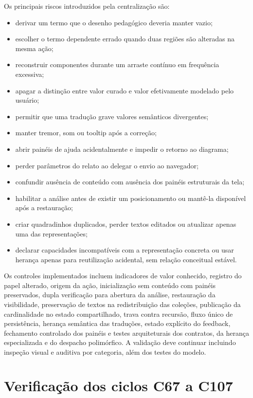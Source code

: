 \documentclass[12pt,a4paper]{article}
\begin{document}
Os principais riscos introduzidos pela centralização são:
\begin{itemize}[noitemsep]
  \item derivar um termo que o desenho pedagógico deveria manter vazio;
  \item escolher o termo dependente errado quando duas regiões são alteradas na mesma ação;
  \item reconstruir componentes durante um arraste contínuo em frequência excessiva;
  \item apagar a distinção entre valor curado e valor efetivamente modelado pelo usuário;
  \item permitir que uma tradução grave valores semânticos divergentes;
  \item manter tremor, som ou tooltip após a correção;
  \item abrir painéis de ajuda acidentalmente e impedir o retorno ao diagrama;
  \item perder parâmetros do relato ao delegar o envio ao navegador;
  \item confundir ausência de conteúdo com ausência dos painéis estruturais da tela;
  \item habilitar a análise antes de existir um posicionamento ou mantê-la disponível após a restauração;
  \item criar quadradinhos duplicados, perder textos editados ou atualizar apenas uma das representações;
  \item declarar capacidades incompatíveis com a representação concreta ou usar herança apenas para reutilização acidental, sem relação conceitual estável.
\end{itemize}

Os controles implementados incluem indicadores de valor conhecido, registro do papel alterado, origem da ação, inicialização sem conteúdo com painéis preservados, dupla verificação para abertura da análise, restauração da visibilidade, preservação de textos na redistribuição das coleções, publicação da cardinalidade no estado compartilhado, trava contra recursão, fluxo único de persistência, herança semântica das traduções, estado explícito do feedback, fechamento controlado dos painéis e testes arquiteturais dos contratos, da herança especializada e do despacho polimórfico. A validação deve continuar incluindo inspeção visual e auditiva por categoria, além dos testes do modelo.

\section{Verificação dos ciclos C67 a C107}
\end{document}
